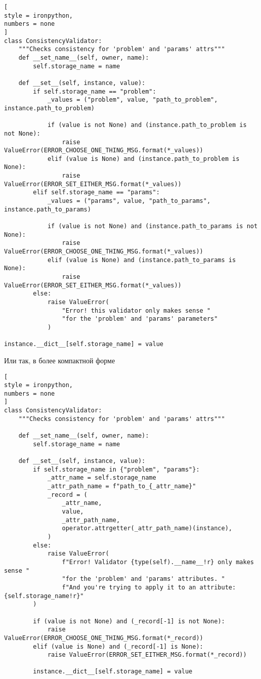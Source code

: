 \documentclass[%
	11pt,
	a4paper,
	utf8,
		]{article}
\begin{document}
\begin{lstlisting}[
style = ironpython,
numbers = none
]
class ConsistencyValidator:
	"""Checks consistency for 'problem' and 'params' attrs"""
	def __set_name__(self, owner, name):
		self.storage_name = name

	def __set__(self, instance, value):
		if self.storage_name == "problem":
			_values = ("problem", value, "path_to_problem", instance.path_to_problem)

			if (value is not None) and (instance.path_to_problem is not None):
				raise ValueError(ERROR_CHOOSE_ONE_THING_MSG.format(*_values))
			elif (value is None) and (instance.path_to_problem is None):
				raise ValueError(ERROR_SET_EITHER_MSG.format(*_values))
		elif self.storage_name == "params":
			_values = ("params", value, "path_to_params", instance.path_to_params)

			if (value is not None) and (instance.path_to_params is not None):
				raise ValueError(ERROR_CHOOSE_ONE_THING_MSG.format(*_values))
			elif (value is None) and (instance.path_to_params is None):
				raise ValueError(ERROR_SET_EITHER_MSG.format(*_values))
		else:
			raise ValueError(
				"Error! this validator only makes sense "
				"for the 'problem' and 'params' parameters"
			)

instance.__dict__[self.storage_name] = value
\end{lstlisting}

Или так, в более компактной форме
\begin{lstlisting}[
style = ironpython,
numbers = none
]
class ConsistencyValidator:
	"""Checks consistency for 'problem' and 'params' attrs"""

	def __set_name__(self, owner, name):
		self.storage_name = name

	def __set__(self, instance, value):
		if self.storage_name in {"problem", "params"}:
			_attr_name = self.storage_name
			_attr_path_name = f"path_to_{_attr_name}"
			_record = (
				_attr_name,
				value,
				_attr_path_name,
				operator.attrgetter(_attr_path_name)(instance),
			)
		else:
			raise ValueError(
				f"Error! Validator {type(self).__name__!r} only makes sense "
				"for the 'problem' and 'params' attributes. "
				f"And you're trying to apply it to an attribute: {self.storage_name!r}"
		)

		if (value is not None) and (_record[-1] is not None):
			raise ValueError(ERROR_CHOOSE_ONE_THING_MSG.format(*_record))
		elif (value is None) and (_record[-1] is None):
			raise ValueError(ERROR_SET_EITHER_MSG.format(*_record))

		instance.__dict__[self.storage_name] = value
\end{lstlisting}
\end{document}
